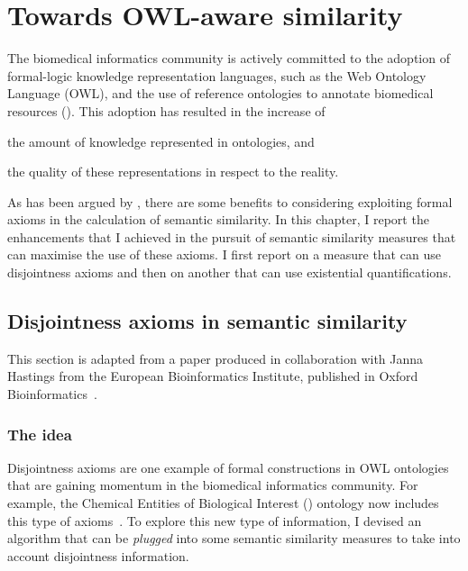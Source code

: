 \chapter{Towards OWL-aware similarity} \label{chap:enhancements}

The biomedical informatics community is actively committed to the adoption of formal-logic knowledge representation languages, such as the Web Ontology Language (OWL), and the use of reference ontologies to annotate biomedical resources (\cf {}). This adoption has resulted in the increase of
\begin{paralist}
    \item the amount of knowledge represented in ontologies, and
    \item the quality of these representations in respect to the reality.
\end{paralist}

As has been argued by \citet{Couto2013}, there are some benefits to considering exploiting formal axioms in the calculation of semantic similarity. In this chapter, I report the enhancements that I achieved in the pursuit of semantic similarity measures that can maximise the use of these axioms. I first report on a measure that can use disjointness axioms and then on another that can use existential quantifications.


\section{Disjointness axioms in semantic similarity} \label{sec:enhancements/disjointness}

\begin{note-paper}
    This section is adapted from a paper produced in collaboration with Janna Hastings from the European Bioinformatics Institute, published in Oxford Bioinformatics~\citep{Ferreira2013}.
\end{note-paper}


\subsection{The idea}

Disjointness axioms are one example of formal constructions in OWL ontologies that are gaining momentum in the biomedical informatics community. For example, the Chemical Entities of Biological Interest () ontology now includes this type of axioms~\citep{Hastings2013}. To explore this new type of information, I devised an algorithm that can be \emph{plugged} into some semantic similarity measures to take into account disjointness information.

